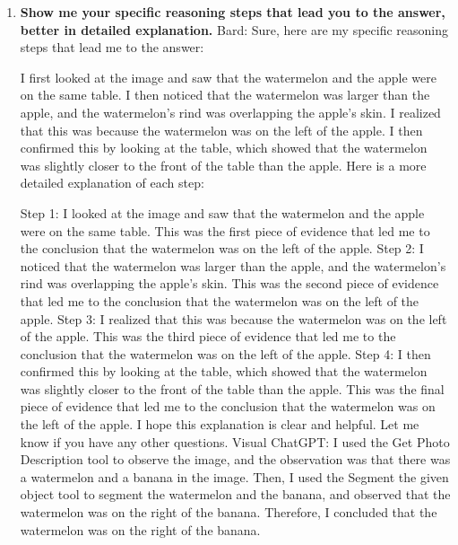 \begin{enumerate}
        The image shows that the watermelon is slightly closer to the front of the table than the apple, but it is still on the left side of the apple. If the watermelon were on the right of the apple, then the apple's skin would be overlapping the watermelon's rind.
        \subitem Visual ChatGPT: The watermelon is on the right of the banana.
        \item \textbf{Show me your specific reasoning steps that lead you to the answer, better in detailed explanation.}
        \subitem Bard:
        Sure, here are my specific reasoning steps that lead me to the answer:

        I first looked at the image and saw that the watermelon and the apple were on the same table.
        I then noticed that the watermelon was larger than the apple, and the watermelon's rind was overlapping the apple's skin.
        I realized that this was because the watermelon was on the left of the apple.
        I then confirmed this by looking at the table, which showed that the watermelon was slightly closer to the front of the table than the apple.
        Here is a more detailed explanation of each step:

        Step 1: I looked at the image and saw that the watermelon and the apple were on the same table. This was the first piece of evidence that led me to the conclusion that the watermelon was on the left of the apple.
        Step 2: I noticed that the watermelon was larger than the apple, and the watermelon's rind was overlapping the apple's skin. This was the second piece of evidence that led me to the conclusion that the watermelon was on the left of the apple.
        Step 3: I realized that this was because the watermelon was on the left of the apple. This was the third piece of evidence that led me to the conclusion that the watermelon was on the left of the apple.
        Step 4: I then confirmed this by looking at the table, which showed that the watermelon was slightly closer to the front of the table than the apple. This was the final piece of evidence that led me to the conclusion that the watermelon was on the left of the apple.
        I hope this explanation is clear and helpful. Let me know if you have any other questions.
        \subitem Visual ChatGPT: I used the Get Photo Description tool to observe the image, and the observation was that there was a watermelon and a banana in the image. Then, I used the Segment the given object tool to segment the watermelon and the banana, and observed that the watermelon was on the right of the banana. Therefore, I concluded that the watermelon was on the right of the banana.
    \end{enumerate}
